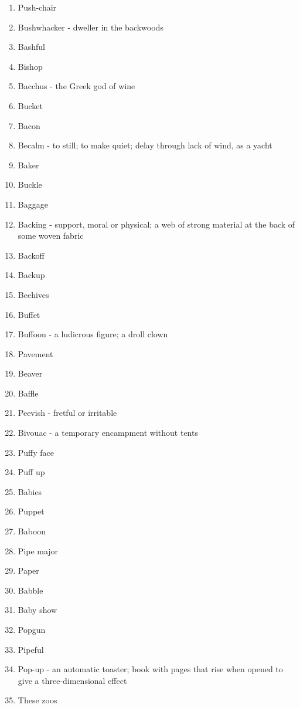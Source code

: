 \begin{enumerate}
        \item Push-chair
        \item Bushwhacker - dweller in the backwoods
        \item Bashful
        \item Bishop
        \item Bacchus - the Greek god of wine
        \item Bucket
        \item Bacon
        \item Becalm - to still; to make quiet; delay through lack of wind, as a yacht
        \item Baker
        \item Buckle
        \item Baggage
        \item Backing - support, moral or physical; a web of strong material at the back of some woven fabric
        \item Backoff
        \item Backup
        \item Beehives
        \item Buffet
        \item Buffoon - a ludicrous figure; a droll clown
        \item Pavement
        \item Beaver
        \item Baffle
        \item Peevish - fretful or irritable
        \item Bivouac - a temporary encampment without tents
        \item Puffy face
        \item Puff up
        \item Babies
        \item Puppet
        \item Baboon
        \item Pipe major
        \item Paper
        \item Babble
        \item Baby show
        \item Popgun
        \item Pipeful
        \item Pop-up - an automatic toaster; book with pages that rise when opened to give a three-dimensional effect
        \item These zoos
    \end{enumerate}



